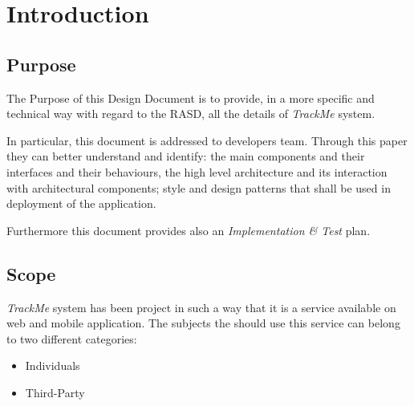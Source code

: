 \documentclass[a4paper]{article}
\begin{document}

\tableofcontents
{}

\newpage
\pagestyle{fancy}

\section{Introduction}

\subsection{Purpose}
    The Purpose of this Design Document is to provide, in a more specific and technical way with regard to the RASD, all the details of \textit{TrackMe} system.
    
    In particular, this document is addressed to  developers team. Through this paper they can better understand and identify: the main components and their interfaces and their behaviours, the high level architecture and its interaction with architectural components; style and design patterns that shall be used in deployment of the application.
    
    Furthermore this document provides also an \textit{Implementation \& Test} plan.
 
    \subsection{Scope}
    \textit{TrackMe} system has been project in such a way that it is a service available on web and mobile application. The subjects the should use this service can belong to two different categories:
    \newline
    \begin{itemize}
    
    \item{Individuals}
    
    \item{Third-Party}
    \newline
    \end{itemize}
    
\end{document}
